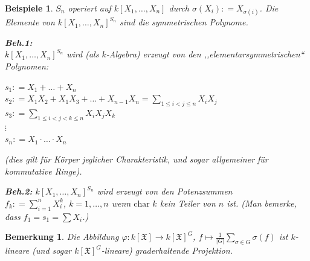 \documentclass[a4paper,12pt]{scrbook}
\theoremstyle{break}
\theoremstyle{nonumberbreak}
\newtheorem{nnBem}{Bemerkung}
\newtheorem{nnBsp}{Beispiele}
\theoremstyle{nonumberplain}
\newcommand{\defeqr}[0]{\mathrel{\mathop:}=}
\begin{document}
\begin{nnBsp}
  $S_n$ operiert auf $k[X_1, \dots, X_n]$ durch $\sigma(X_i) \defeqr X_{\sigma(i)}$. Die Elemente von $k[X_1, \dots, X_n]^{S_n}$ sind die symmetrischen Polynome.

  \textbf{Beh.1:}\\
  $k[X_1, \dots, X_n]^{S_n}$ wird (als $k$-Algebra) erzeugt von den ,,elementarsymmetrischen`` Polynomen:

  $s_1 \defeqr X_1 + \dots + X_n$\\
  $s_2 \defeqr X_1X_2 + X_1X_3 + \dots + X_{n-1}X_n = \sum_{1 \leq i < j \leq n} X_i X_j$\\
  $s_3 \defeqr \sum_{1 \leq i < j < k \leq n} X_i X_j X_k$\\
  $\vdots$\\
  $s_n \defeqr X_1 \cdot \ldots \cdot X_n$

  (dies gilt für Körper jeglicher Charakteristik, und sogar allgemeiner für kommutative Ringe).

  \textbf{Beh.2:} $k[X_1, \dots, X_n]^{S_n}$ wird erzeugt von den Potenzsummen\\
  $f_k \defeqr \sum_{i=1}^n X_i^k$, $k = 1, \dots, n$
  wenn $\mbox{char }k$ kein Teiler von $n$ ist. (Man bemerke, dass $f_1 = s_1 = \sum X_i$.)
\end{nnBsp}

\begin{nnBem}
  Die Abbildung $\varphi: k[\mathfrak{X}] \to k[\mathfrak{X}]^G$, $f \mapsto \frac{1}{|G|}\sum_{\sigma \in G} \sigma(f)$ ist $k$-lineare (und sogar $k\left[\mathfrak{X}\right]^G$-lineare) graderhaltende Projektion.
\end{nnBem}
\end{document}
